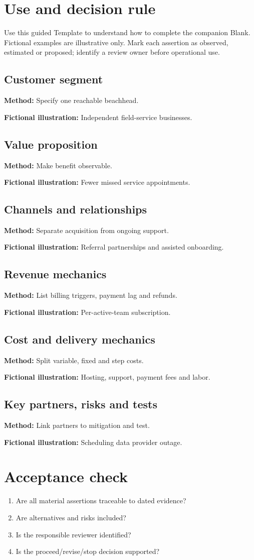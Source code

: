\documentclass[11pt]{article}
\begin{document}
\SuiteOpen
\section{Use and decision rule}
Use this guided Template to understand how to complete the companion Blank. Fictional examples are illustrative only. Mark each assertion as observed, estimated or proposed; identify a review owner before operational use.
\subsection*{Customer segment}
\textbf{Method:} Specify one reachable beachhead.\par\textbf{Fictional illustration:} Independent field-service businesses.\par
\subsection*{Value proposition}
\textbf{Method:} Make benefit observable.\par\textbf{Fictional illustration:} Fewer missed service appointments.\par
\subsection*{Channels and relationships}
\textbf{Method:} Separate acquisition from ongoing support.\par\textbf{Fictional illustration:} Referral partnerships and assisted onboarding.\par
\subsection*{Revenue mechanics}
\textbf{Method:} List billing triggers, payment lag and refunds.\par\textbf{Fictional illustration:} Per-active-team subscription.\par
\subsection*{Cost and delivery mechanics}
\textbf{Method:} Split variable, fixed and step costs.\par\textbf{Fictional illustration:} Hosting, support, payment fees and labor.\par
\subsection*{Key partners, risks and tests}
\textbf{Method:} Link partners to mitigation and test.\par\textbf{Fictional illustration:} Scheduling data provider outage.\par
\section{Acceptance check}
\begin{enumerate}[leftmargin=*,itemsep=5pt]
\item Are all material assertions traceable to dated evidence?
\item Are alternatives and risks included?
\item Is the responsible reviewer identified?
\item Is the proceed/revise/stop decision supported?
\end{enumerate}
\end{document}
